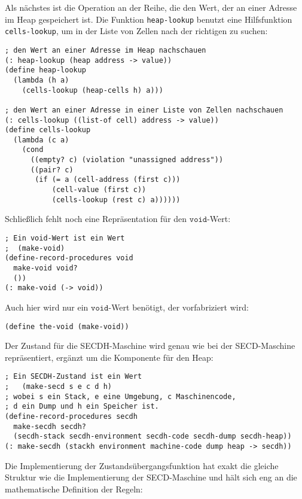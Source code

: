 %
Als nächstes ist die Operation an der Reihe, die den Wert, der an einer
Adresse im Heap gespeichert ist.  Die Funktion \texttt{heap-lookup} benutzt
eine Hilfsfunktion \texttt{cells-lookup}, um in der Liste von Zellen
nach der richtigen zu suchen:
%
\begin{verbatim}
; den Wert an einer Adresse im Heap nachschauen
(: heap-lookup (heap address -> value))
(define heap-lookup
  (lambda (h a)
    (cells-lookup (heap-cells h) a)))

; den Wert an einer Adresse in einer Liste von Zellen nachschauen
(: cells-lookup ((list-of cell) address -> value))
(define cells-lookup
  (lambda (c a)
    (cond
      ((empty? c) (violation "unassigned address"))
      ((pair? c)
       (if (= a (cell-address (first c)))
           (cell-value (first c))
           (cells-lookup (rest c) a))))))
\end{verbatim}
%
Schließlich fehlt noch eine Repräsentation für den $\mathtt{void}$-Wert:
%
\begin{verbatim}
; Ein void-Wert ist ein Wert
;  (make-void)
(define-record-procedures void
  make-void void?
  ())
(: make-void (-> void))
\end{verbatim}
%
Auch hier wird nur ein $\mathtt{void}$-Wert benötigt, der 
vorfabriziert wird:
%
\begin{verbatim}
(define the-void (make-void))
\end{verbatim}
%
Der Zustand für die SECDH-Maschine wird genau wie bei der
SECD-Maschine repräsentiert, ergänzt um die Komponente für den Heap:
%
\begin{verbatim}
; Ein SECDH-Zustand ist ein Wert
;   (make-secd s e c d h)
; wobei s ein Stack, e eine Umgebung, c Maschinencode,
; d ein Dump und h ein Speicher ist.
(define-record-procedures secdh
  make-secdh secdh?
  (secdh-stack secdh-environment secdh-code secdh-dump secdh-heap))
(: make-secdh (stackh environment machine-code dump heap -> secdh))
\end{verbatim}
%
Die Implementierung der Zustandsübergangsfunktion hat exakt die
gleiche Struktur wie die Implementierung der SECD-Maschine und hält
sich eng an die mathematische Definition der Regeln:
%
